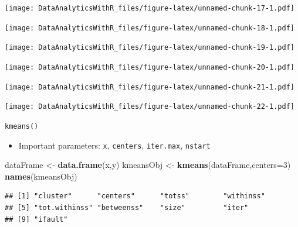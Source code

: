 \documentclass[]{book}
\newenvironment{Shaded}{\begin{snugshade}}{\end{snugshade}}
\newcommand{\DataTypeTok}[1]{\textcolor[rgb]{0.13,0.29,0.53}{#1}}
\newcommand{\DecValTok}[1]{\textcolor[rgb]{0.00,0.00,0.81}{#1}}
\newcommand{\FloatTok}[1]{\textcolor[rgb]{0.00,0.00,0.81}{#1}}
\newcommand{\KeywordTok}[1]{\textcolor[rgb]{0.13,0.29,0.53}{\textbf{#1}}}
\newcommand{\NormalTok}[1]{#1}
\newcommand{\OperatorTok}[1]{\textcolor[rgb]{0.81,0.36,0.00}{\textbf{#1}}}
\newcommand{\StringTok}[1]{\textcolor[rgb]{0.31,0.60,0.02}{#1}}
\providecommand{\tightlist}{%
  \setlength{\itemsep}{0pt}\setlength{\parskip}{0pt}}
\begin{document}
\begin{Shaded}
\end{Shaded}

\texttt{[image: DataAnalyticsWithR\_files/figure-latex/unnamed-chunk-17-1.pdf]}

\texttt{[image: DataAnalyticsWithR\_files/figure-latex/unnamed-chunk-18-1.pdf]}

\texttt{[image: DataAnalyticsWithR\_files/figure-latex/unnamed-chunk-19-1.pdf]}

\texttt{[image: DataAnalyticsWithR\_files/figure-latex/unnamed-chunk-20-1.pdf]}

\texttt{[image: DataAnalyticsWithR\_files/figure-latex/unnamed-chunk-21-1.pdf]}

\texttt{[image: DataAnalyticsWithR\_files/figure-latex/unnamed-chunk-22-1.pdf]}

\texttt{kmeans()}

\begin{itemize}
\tightlist
\item
  Important parameters: \texttt{x}, \texttt{centers}, \texttt{iter.max}, \texttt{nstart}
\end{itemize}

\begin{Shaded}
\begin{Highlighting}[]
\NormalTok{dataFrame <-}\StringTok{ }\KeywordTok{data.frame}\NormalTok{(x,y)}
\NormalTok{kmeansObj <-}\StringTok{ }\KeywordTok{kmeans}\NormalTok{(dataFrame,}\DataTypeTok{centers=}\DecValTok{3}\NormalTok{)}
\KeywordTok{names}\NormalTok{(kmeansObj)}
\end{Highlighting}
\end{Shaded}

\begin{verbatim}
## [1] "cluster"      "centers"      "totss"        "withinss"    
## [5] "tot.withinss" "betweenss"    "size"         "iter"        
## [9] "ifault"
\end{verbatim}
\end{document}
